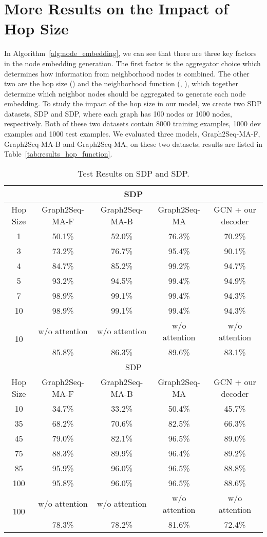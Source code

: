 \documentclass{article} \usepackage{iclr2019_conference,times}
\begin{document}
\section{More Results on the Impact of Hop Size}
\label{App:More Results on Impact of Neighbor-Node Selection}
In Algorithm~\ref{alg:node_embedding}, we can see that there are three key factors in the node embedding generation.
The first factor is the aggregator choice which determines how information from neighborhood nodes is combined. The other two are the hop size () and the neighborhood function (, ), 
which together determine which neighbor nodes should be aggregated to generate each node embedding.
To study the impact of the hop size in our model, we create two SDP datasets, SDP and SDP, where each graph has 100 nodes or 1000 nodes, respectively.
Both of these two datasets contain 8000 training examples, 1000 dev examples and 1000 test examples. We evaluated three models, Graph2Seq-MA-F, Graph2Seq-MA-B and Graph2Seq-MA, on these two datasets; results are listed in Table~\ref{tab:results_hop_function}.


\begin{table}[t!]
\small
\centering
\begin{tabular}{ccccc}
\multicolumn{5}{c}{SDP} \\ 
\hline
Hop Size & Graph2Seq-MA-F & Graph2Seq-MA-B & Graph2Seq-MA & GCN \citep{kipf2016semi} + our decoder  \\
1 & 50.1\% & 52.0\% & 76.3\% & 70.2\% \\
3 & 73.2\% & 76.7\% & 95.4\% & 90.1\% \\
4 & 84.7\% & 85.2\% & 99.2\% & 94.7\% \\
5 & 93.2\% & 94.5\% & 99.4\% & 94.9\% \\
7 & 98.9\% & 99.1\% & 99.4\% & 94.3\% \\
10 & 98.9\% & 99.1\% & 99.4\% &  94.3\% \\
\hline
\multirow{2}{*}{10} & w/o attention & w/o attention & w/o attention & w/o attention \\
& 85.8\% & 86.3\% & 89.6\% & 83.1\% \\
\multicolumn{5}{c}{SDP} \\ 
\hline
Hop Size & Graph2Seq-MA-F & Graph2Seq-MA-B & Graph2Seq-MA & GCN \citep{kipf2016semi} + our decoder  \\
10 & 34.7\% & 33.2\% & 50.4\% & 45.7\% \\
35 & 68.2\% & 70.6\% & 82.5\% & 66.3\% \\
45 & 79.0\% & 82.1\% & 96.5\% & 89.0\% \\
75 & 88.3\% & 89.9\% & 96.4\% & 89.2\% \\
85 & 95.9\% & 96.0\% & 96.5\% & 88.8\% \\
100 & 95.8\% & 96.0\% & 96.5\% & 88.6\% \\
\hline
\multirow{2}{*}{100} & w/o attention & w/o attention & w/o attention & w/o attention \\
& 78.3\% & 78.2\% & 81.6\% & 72.4\% \\
\hline
\end{tabular}
\caption{Test Results on SDP and SDP.}
\label{app:tab:results_hop_function}
\vspace{-0.7cm}
\end{table}
\end{document}
